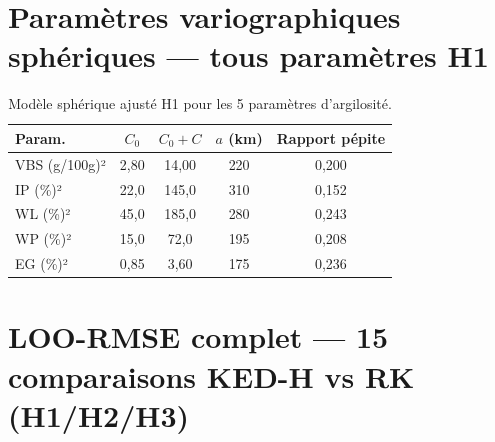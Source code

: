 \documentclass[10pt,a4paper,twocolumn]{article}
\begin{document}
\section{Paramètres variographiques sphériques — tous paramètres H1}
\label{app:variogrammes}

\begin{table}[htbp]
\centering\small
\caption{Modèle sphérique ajusté H1 pour les 5 paramètres d'argilosité.}
\label{tab:variogrammes}
\begin{tabular}{lcccc}
\toprule
Param. & $C_0$ & $C_0+C$ & $a$ (km) & Rapport pépite \\
\midrule
VBS (g/100g)² & 2,80  & 14,00  & 220 & 0,200 \\
IP (\%)²      & 22,0  & 145,0  & 310 & 0,152 \\
WL (\%)²      & 45,0  & 185,0  & 280 & 0,243 \\
WP (\%)²      & 15,0  & 72,0   & 195 & 0,208 \\
EG (\%)²      & 0,85  & 3,60   & 175 & 0,236 \\
\bottomrule
\end{tabular}
\end{table}

\section{LOO-RMSE complet — 15 comparaisons KED-H vs RK (H1/H2/H3)}
\label{app:loo_complet}
\end{document}
